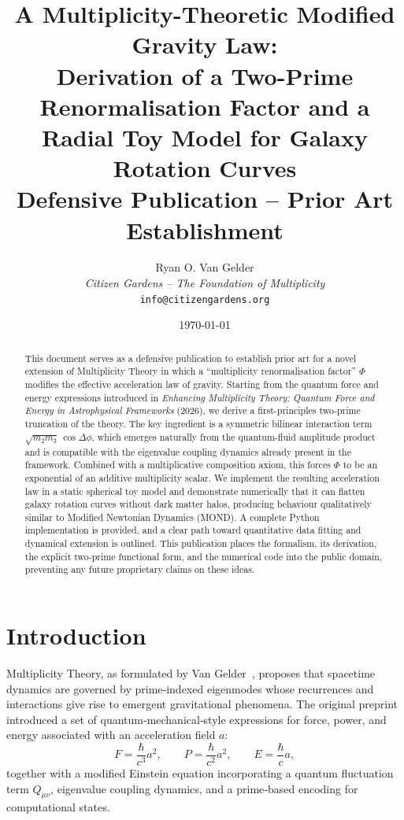 \documentclass[11pt,a4paper]{article}
\title{\bfseries A Multiplicity-Theoretic Modified Gravity Law:\\
Derivation of a Two-Prime Renormalisation Factor
and a Radial Toy Model for Galaxy Rotation Curves\\[0.3cm]
\large Defensive Publication – Prior Art Establishment}
\author{Ryan O. Van Gelder\\[0.2cm]
\textit{Citizen Gardens -- The Foundation of Multiplicity}\\
\texttt{info@citizengardens.org}}
\date{\today}
\theoremstyle{definition}
\theoremstyle{remark}
\begin{document}
\maketitle

\begin{abstract}
This document serves as a defensive publication to establish prior art for a novel extension of Multiplicity Theory in which a ``multiplicity renormalisation factor'' $\Phi$ modifies the effective acceleration law of gravity.
Starting from the quantum force and energy expressions introduced in \textit{Enhancing Multiplicity Theory: Quantum Force and Energy in Astrophysical Frameworks} (2026), we derive a first-principles two‑prime truncation of the theory.
The key ingredient is a symmetric bilinear interaction term $\sqrt{m_2 m_3}\,\cos\Delta\phi$, which emerges naturally from the quantum‑fluid amplitude product and is compatible with the eigenvalue coupling dynamics already present in the framework.
Combined with a multiplicative composition axiom, this forces $\Phi$ to be an exponential of an additive multiplicity scalar.
We implement the resulting acceleration law in a static spherical toy model and demonstrate numerically that it can flatten galaxy rotation curves without dark matter halos, producing behaviour qualitatively similar to Modified Newtonian Dynamics (MOND).
A complete Python implementation is provided, and a clear path toward quantitative data fitting and dynamical extension is outlined.
This publication places the formalism, its derivation, the explicit two‑prime functional form, and the numerical code into the public domain, preventing any future proprietary claims on these ideas.
\end{abstract}

\section{Introduction}
Multiplicity Theory, as formulated by Van Gelder~\cite{VanGelder2026}, proposes that spacetime dynamics are governed by prime‑indexed eigenmodes whose recurrences and interactions give rise to emergent gravitational phenomena.
The original preprint introduced a set of quantum‑mechanical‑style expressions for force, power, and energy associated with an acceleration field $a$:
\begin{equation}
F = \frac{\hbar}{c^3}a^2,\qquad P = \frac{\hbar}{c^2}a^2,\qquad E = \frac{\hbar}{c}a,
\label{eq:orig}
\end{equation}
together with a modified Einstein equation incorporating a quantum fluctuation term $Q_{\mu\nu}$, eigenvalue coupling dynamics, and a prime‑based encoding for computational states.
\end{document}
